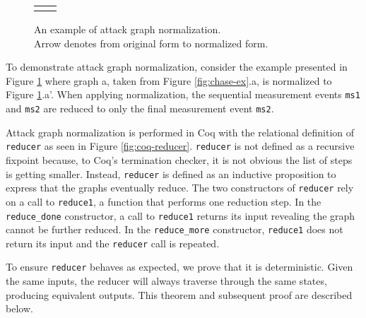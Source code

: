 \documentclass[runningheads]{llncs}
\theoremstyle{definition}
\begin{document}
\begin{figure}[htbp]
    \centering 
    \begin{tabular}{c c}
         &  
    \end{tabular}
    \captionsetup{justification=centering,margin=1cm}
    \caption[Example of attack graph normalization]{An example of attack graph normalization. \\ Arrow denotes from original form to normalized form.}
    \label{fig:reduce-ex}
\end{figure}
\noindent To demonstrate attack graph normalization, consider the example presented in Figure \ref{fig:reduce-ex} where graph a, taken from Figure \ref{fig:chase-ex}.a, is normalized to Figure \ref{fig:reduce-ex}.a'. When applying normalization, the sequential measurement events \texttt{ms1} and \texttt{ms2} are reduced to only the final measurement event \texttt{ms2}. 


Attack graph normalization is performed in Coq with the relational definition of \texttt{reducer} as seen in Figure \ref{fig:coq-reducer}. \texttt{reducer} is not defined as a recursive fixpoint because, to Coq's termination checker, it is not obvious the list of steps is getting smaller. Instead, \texttt{reducer} is defined as an inductive proposition to express that the graphs eventually reduce. The two constructors of \texttt{reducer} rely on a call to \texttt{reduce1}, a function that performs one reduction step. In the \texttt{reduce\_done} constructor, a call to \texttt{reduce1} returns its input revealing the graph cannot be further reduced. In the \texttt{reduce\_more} constructor, \texttt{reduce1} does not return its input and the \texttt{reducer} call is repeated.


To ensure \texttt{reducer} behaves as expected, we prove that it is deterministic. Given the same inputs, the reducer will always traverse through the same states, producing equivalent outputs. This theorem and subsequent proof are described below.
\end{document}
